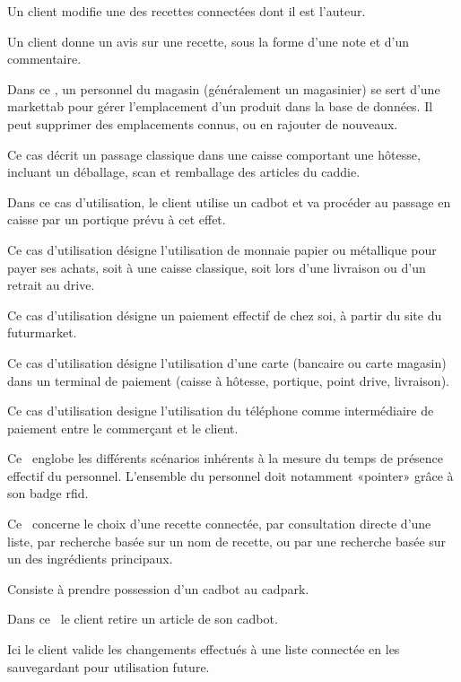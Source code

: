 Un client modifie une des recettes connectées dont il est l'auteur.

Un client donne un avis sur une recette, sous la forme d'une note et d'un commentaire.

Dans ce \cu, un personnel du magasin (généralement un magasinier) se sert d'une markettab pour gérer l'emplacement d'un produit dans la base de données.
Il peut supprimer des emplacements connus, ou en rajouter de nouveaux.

Ce cas décrit un passage classique dans une caisse comportant une hôtesse, incluant un déballage, scan et remballage des articles du caddie.

Dans ce cas d'utilisation, le client utilise un cadbot et va procéder au passage en caisse par un portique prévu à cet effet. 

Ce cas d'utilisation désigne l'utilisation de monnaie papier ou métallique pour payer ses achats, soit à une caisse classique, soit lors d'une livraison ou d'un retrait au drive.

Ce cas d'utilisation désigne un paiement effectif de chez soi, à partir du site du futurmarket.

Ce cas d'utilisation désigne l'utilisation d'une carte (bancaire ou carte magasin) dans un terminal de paiement (caisse à hôtesse, portique, point drive, livraison).

Ce cas d'utilisation designe l'utilisation du téléphone comme intermédiaire de paiement entre le commerçant et le client. 

Ce \cu\ englobe les différents scénarios inhérents à la mesure du temps de présence effectif du personnel.
L'ensemble du personnel doit notamment «pointer» grâce à son badge rfid.

Ce \cu\ concerne le choix d'une recette connectée, par consultation directe d'une liste, par recherche basée sur un nom de recette, ou par une recherche basée sur un des ingrédients principaux.

Consiste à prendre possession d'un cadbot au cadpark.

Dans ce \cu\ le client retire un article de son cadbot.

Ici le client valide les changements effectués à une liste connectée en les sauvegardant pour utilisation future.

